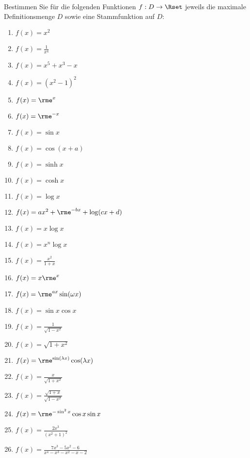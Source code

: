Bestimmen Sie für die folgenden Funktionen $f:D\to\Rset$ jeweils die maximale Definitionsmenge $D$ sowie eine Stammfunktion auf $D$:\\
\parbox{0.4\textwidth}{\begin{enumerate}
\item $f(x)=x^2$
\item $f(x)=\frac{1}{x^4}$
\item $f(x)=x^5+x^3-x$
\item $f(x)=(x^2-1)^2$
\item $f(x)=\rme^x$
\item $f(x)=\rme^{-x}$
\item $f(x)=\sin x$
\item $f(x)=\cos (x+a)$
\item $f(x)=\sinh x$
\item $f(x)=\cosh x$
\item $f(x)=\log x$
\item $f(x)=a x^2+\rme^{-bx}+\log (c x+d)$
\item $f(x)=x\log x$
\end{enumerate}}\parbox{0.6\textwidth}{\begin{enumerate}\setcounter{enumi}{13}
\item $f(x)=x^n\log x$
\item $f(x)=\frac{x^2}{1+x}$
\item $f(x)=x\rme^x$
\item $f(x)=\rme^{ax}\sin (\omega x)$
\item $f(x)=\sin x\cos x$
\item $f(x)=\frac{1}{\sqrt{1-x^2}}$
\item $f(x)=\sqrt{1+x^2}$
\item $f(x)=\rme^{\sin(\lambda x)}\cos(\lambda x)$
\item $f(x)=\frac{x}{\sqrt{1+x^2}}$
\item $f(x)=\frac{\sqrt{1+x}}{\sqrt{1-x^2}}$
\item $f(x)=\rme^{-\sin^2 x}\cos x\sin x$
\item $f(x)=\frac{2 x^3}{(x^2+1)^2}$
\item $f(x)=\frac{7 x^3-5 x^2-6}{x^4-x^3-x^2-x-2}$
\end{enumerate}}




